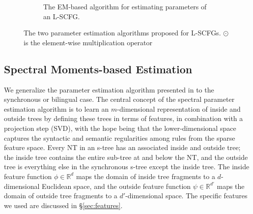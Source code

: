 \documentclass[11pt]{article}
\begin{document}
\begin{figure*}[t!]
{\begin{footnotesize}
\begin{subfigure}{1.05\columnwidth}
\begin{itemize}
\begin{itemize}[label={},nolistsep]
			\end{itemize}
	\end{itemize}		
	\caption{\small The EM-based algorithm for estimating parameters of an L-SCFG.}
	\label{fig:emlearn}	
	\end{subfigure}		
	\end{footnotesize}}
	\caption{The two parameter estimation algorithms proposed for L-SCFGs. $\odot$ is the element-wise multiplication operator}
	\label{fig:estimation-algos}
\end{figure*}

\subsection{Spectral Moments-based Estimation}
\label{sec:spectral} 
We generalize the parameter estimation algorithm presented in  to the synchronous or bilingual case. 
The central concept of the spectral parameter estimation algorithm is to learn an $m$-dimensional representation of inside and outside trees by defining these trees in terms of features, in combination with a projection step (SVD), with the hope being that the lower-dimensional space captures the syntactic and semantic regularities among rules from the sparse feature space. 
Every NT in an s-tree has an associated inside and outside tree; the inside tree contains the entire sub-tree at and below the NT, and the outside tree is everything else in the synchronous s-tree except the inside tree.   
The inside feature function $\phi \in \mathbb{R}^d$ maps the domain of inside tree fragments to a $d$-dimensional Euclidean space, and the outside feature function $\psi \in \mathbb{R}^{d'}$ maps the domain of outside tree fragments to a $d'$-dimensional space. 
The specific features we used are discussed in \S\ref{sec:features}.  
\end{document}
